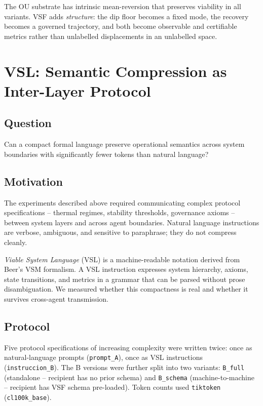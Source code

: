 \documentclass[11pt, a4paper]{article}
\begin{document}
The OU substrate has intrinsic mean-reversion that preserves viability in all
variants.
VSF adds \emph{structure}: the dip floor becomes a fixed mode, the recovery
becomes a governed trajectory, and both become observable and certifiable metrics
rather than unlabelled displacements in an unlabelled space.

\section{VSL: Semantic Compression as Inter-Layer Protocol}
\label{sec:vsl}

\subsection*{Question}
Can a compact formal language preserve operational semantics across system
boundaries with significantly fewer tokens than natural language?

\subsection{Motivation}

The experiments described above required communicating complex protocol
specifications -- thermal regimes, stability thresholds, governance axioms --
between system layers and across agent boundaries.
Natural language instructions are verbose, ambiguous, and sensitive to
paraphrase; they do not compress cleanly.

\emph{Viable System Language} (VSL) is a machine-readable notation derived
from Beer's VSM formalism.
A VSL instruction expresses system hierarchy, axioms, state transitions,
and metrics in a grammar that can be parsed without prose disambiguation.
We measured whether this compactness is real and whether it survives
cross-agent transmission.

\subsection{Protocol}

Five protocol specifications of increasing complexity were written twice:
once as natural-language prompts (\texttt{prompt\_A}), once as VSL
instructions (\texttt{instruccion\_B}).
The B versions were further split into two variants:
\texttt{B\_full} (standalone -- recipient has no prior schema)
and \texttt{B\_schema} (machine-to-machine -- recipient has VSF schema
pre-loaded).
Token counts used \texttt{tiktoken} (\texttt{cl100k\_base}).
\end{document}
